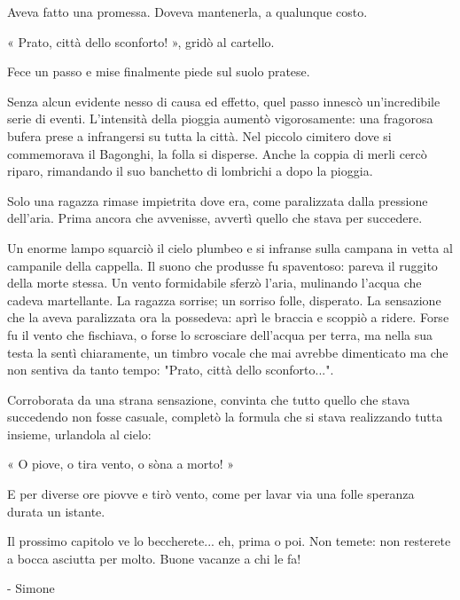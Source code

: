 Aveva fatto una promessa. Doveva mantenerla, a qualunque costo.

« Prato, città dello sconforto! », gridò al cartello.

Fece un passo e mise finalmente piede sul suolo pratese.

Senza alcun evidente nesso di causa ed effetto, quel passo innescò un'incredibile serie di eventi. L'intensità della pioggia aumentò vigorosamente: una fragorosa bufera prese a infrangersi su tutta la città. Nel piccolo cimitero dove si commemorava il Bagonghi, la folla si disperse. Anche la coppia di merli cercò riparo, rimandando il suo banchetto di lombrichi a dopo la pioggia. 

Solo una ragazza rimase impietrita dove era, come paralizzata dalla pressione dell'aria. Prima ancora che avvenisse, avvertì quello che stava per succedere.

Un enorme lampo squarciò il cielo plumbeo e si infranse sulla campana in vetta al campanile della cappella. Il suono che produsse fu spaventoso: pareva il ruggito della morte stessa. Un vento formidabile sferzò l'aria, mulinando l'acqua che cadeva martellante. La ragazza sorrise; un sorriso folle, disperato. La sensazione che la aveva paralizzata ora la possedeva: aprì le braccia e scoppiò a ridere. Forse fu il vento che fischiava, o forse lo scrosciare dell'acqua per terra, ma nella sua testa la sentì chiaramente, un timbro vocale che mai avrebbe dimenticato ma che non sentiva da tanto tempo: "Prato, città dello sconforto...".

Corroborata da una strana sensazione, convinta che tutto quello che stava succedendo non fosse casuale, completò la formula che si stava realizzando tutta insieme, urlandola al cielo:

« O piove, o tira vento, o sòna a morto! »

E per diverse ore piovve e tirò vento, come per lavar via una folle speranza durata un istante.


Il prossimo capitolo ve lo beccherete... eh, prima o poi. Non temete: non resterete a bocca asciutta per molto. Buone vacanze a chi le fa!

- Simone



